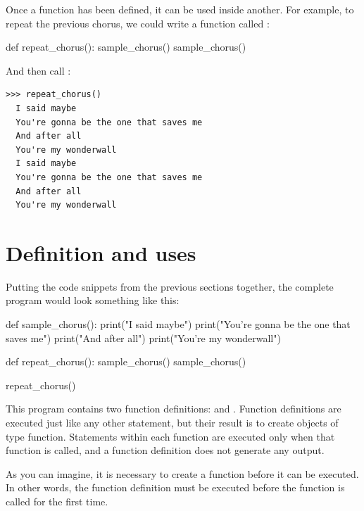 Once a function has been defined, it can be used inside another. For example, to repeat the previous chorus, we could write a function called :

\begin{python}[frame=single]
def repeat_chorus():
    sample_chorus()
    sample_chorus()
\end{python}

And then call :

\begin{Verbatim}[frame=single]
>>> repeat_chorus()
  I said maybe
  You're gonna be the one that saves me
  And after all
  You're my wonderwall
  I said maybe
  You're gonna be the one that saves me
  And after all
  You're my wonderwall
\end{Verbatim}


\hypertarget{definiciuxf3n-y-usos}{%
\section{Definition and uses}\label{definiciuxf3n-y-usos}}


Putting the code snippets from the previous sections together, the complete program would look something like this:

\begin{python}[frame=single]
def sample_chorus():
    print("I said maybe")
    print("You're gonna be the one that saves me")
    print("And after all")
    print("You're my wonderwall")

def repeat_chorus():
    sample_chorus()
    sample_chorus()

repeat_chorus()
\end{python}

This program contains two function definitions:  and . Function definitions are executed just like any other statement, but their result is to create objects of type function. Statements within each function are executed only when that function is called, and a function definition does not generate any output.


As you can imagine, it is necessary to create a function before it can be executed. In other words, the function definition must be executed before the function is called for the first time.

